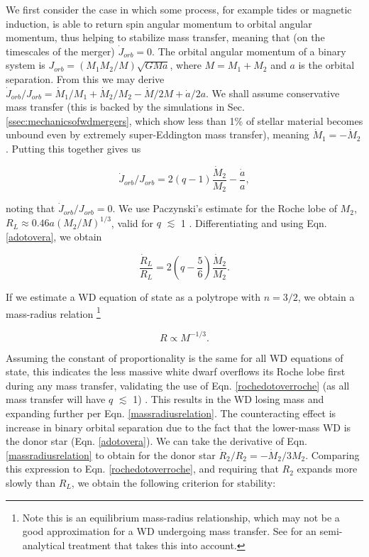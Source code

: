 We first consider the case in which some process, for example tides or magnetic induction, is able to return spin angular momentum to orbital angular momentum, thus helping to stabilize mass transfer, meaning that (on the timescales of the merger) $\dot{J}_{orb} = 0$.  The orbital angular momentum of a binary system is $J_{orb} = (M_1M_2/M)\sqrt{GMa}$, where $M = M_1 + M_2$ and $a$ is the orbital separation.  From this we may derive $\dot{J}_{orb}/J_{orb} = \dot{M}_1/M_1 + \dot{M}_2/M_2 - \dot{M}/2M + \dot{a}/2a$.  We shall assume conservative mass transfer (this is backed by the simulations in Sec. \ref{ssec:mechanicsofwdmergers}, which show less than 1\% of stellar material becomes unbound even by extremely super-Eddington mass transfer), meaning $\dot{M}_1 = -\dot{M}_2$.  Putting this together gives us

\begin{equation}
\dot{J}_{orb}/J_{orb} = 2(q - 1)\frac{\dot{M}_2}{M_2} - \frac{\dot{a}}{a},
\label{adotovera}
\end{equation}

\noindent noting that $\dot{J}_{orb}/J_{orb} = 0$.  We use Paczynski's estimate for the Roche lobe of $M_2$, $R_L \approx 0.46a(M_2/M)^{1/3}$, valid for $q$ $\lesssim$ 1 \citep{eggl83}.  Differentiating and using Eqn. \ref{adotovera}, we obtain

\begin{equation}
\frac{\dot{R}_L}{R_L} = 2(q - \frac{5}{6})\frac{\dot{M}_2}{M_2}.
\label{rochedotoverroche}
\end{equation}

If we estimate a WD equation of state as a polytrope with $n = 3/2$, we obtain a mass-radius relation \citep{motl+07} \footnote{Note this is an equilibrium mass-radius relationship, which may not be a good approximation for a WD undergoing mass transfer.  See \cite{loreig09} for an semi-analytical treatment that takes this into account.}

\begin{equation}
R \propto M^{-1/3}.
\label{massradiusrelation}
\end{equation}

\noindent Assuming the constant of proportionality is the same for all WD equations of state, this indicates the less massive white dwarf overflows its Roche lobe first during any mass transfer, validating the use of Eqn. \ref{rochedotoverroche} (as all mass transfer will have $q$ $\lesssim$ 1)  \citep{came09}.  This results in the WD losing mass and expanding further per Eqn. \ref{massradiusrelation}.  The counteracting effect is increase in binary orbital separation due to the fact that the lower-mass WD is the donor star (Eqn. \ref{adotovera}).  We can take the derivative of Eqn. \ref{massradiusrelation} to obtain for the donor star $\dot{R}_2/R_2 = -\dot{M}_2/3M_2$.  Comparing this expression to Eqn. \ref{rochedotoverroche}, and requiring that $R_2$ expands more slowly than $R_L$, we obtain the following criterion for stability:

